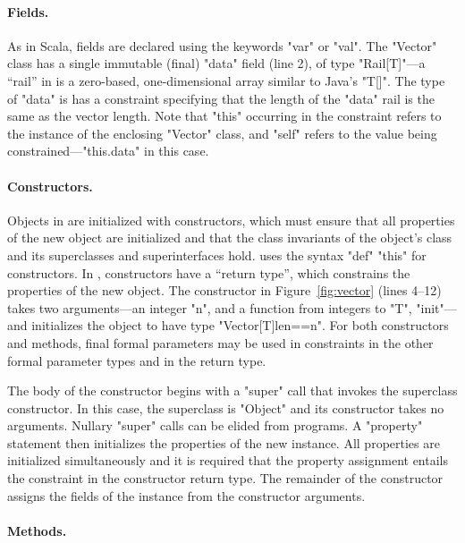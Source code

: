 \paragraph{Fields.}

As in Scala, fields are declared using the keywords \xcd"var"
or \xcd"val".  The \xcd"Vector" class has a single
immutable (final) \xcd"data" field (line 2), of type \xcd"Rail[T]"---a ``rail'' in \Xten is a zero-based, one-dimensional array similar to Java's \xcd"T[]".
The type of \xcd"data" is
has a constraint specifying that the length of
the \xcd"data" rail is the same as the vector length.
Note that \xcd"this" occurring
in the constraint refers to the instance of the enclosing
\xcd"Vector" class,
and \xcd"self" refers to the value being
constrained---\xcd"this.data" in this case.

\paragraph{Constructors.}

Objects in \Xten{} are initialized with constructors, which
must ensure that all properties of the new object
are initialized and that the class invariants of the object's
class and its superclasses and superinterfaces hold.
\Xten{} uses the syntax \xcd"def" \xcd"this" for constructors.
In \Xten{}, constructors have a ``return type'', which constrains
the properties of the new object.  The constructor in
Figure~\ref{fig:vector} (lines 4--12) takes
two arguments---an integer \xcd"n", and a function from integers
to \xcd"T", \xcd"init"---and 
initializes the
object to have type \xcd"Vector[T]{len==n}".
For both constructors and methods,
final formal parameters may be used in constraints
in the 
other formal parameter types and in the return type.

The body of the constructor
begins with a \xcd"super" call that invokes the superclass
constructor.  In this case, the superclass is
\xcd"Object" and its constructor takes no arguments.
Nullary \xcd"super" calls can be elided from \Xten programs.
A \xcd"property" statement then initializes the
properties of the new instance.  All properties are initialized
simultaneously and it is required that the property assignment
entails the constraint in the constructor return type.
The remainder of the constructor assigns the fields of the
instance from the constructor arguments.

\paragraph{Methods.}

